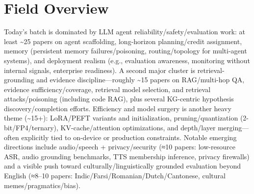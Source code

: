 \documentclass[12pt,letterpaper]{article}
\begin{document}
\medskip



\section*{Field Overview}
{\footnotesize Today's batch is dominated by LLM agent reliability/safety/evaluation work: at least \textasciitilde{}25 papers on agent scaffolding, long-horizon planning/credit assignment, memory (persistent memory failures/poisoning, routing/topology for multi-agent systems), and deployment realism (e.g., evaluation awareness, monitoring without internal signals, enterprise readiness). A second major cluster is retrieval-grounding and evidence discipline---roughly \textasciitilde{}15 papers on RAG/multi-hop QA, evidence sufficiency/coverage, retrieval model selection, and retrieval attacks/poisoning (including code RAG), plus several KG-centric hypothesis discovery/completion efforts. Efficiency and model surgery is another heavy theme (\textasciitilde{}15+): LoRA/PEFT variants and initialization, pruning/quantization (2-bit/FP4/ternary), KV-cache/attention optimizations, and depth/layer merging---often explicitly tied to on-device or production constraints. Notable emerging directions include audio/speech + privacy/security (≈10 papers: low-resource ASR, audio grounding benchmarks, TTS membership inference, privacy firewalls) and a visible push toward culturally/linguistically grounded evaluation beyond English (≈8--10 papers: Indic/Farsi/Romanian/Dutch/Cantonese, cultural memes/pragmatics/bias).}
\end{document}
